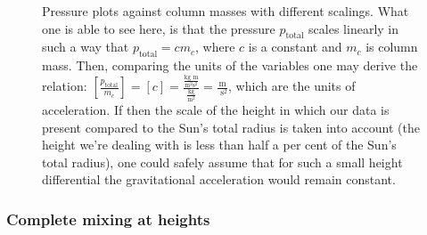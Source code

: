 \documentclass[11pt,a4paper,notitlepage]{article}
\begin{document}
\begin{figure}[H]
\caption{Pressure plots against column masses with different scalings. What one is able to see here, is that the pressure $p_\text{total}$ scales linearly in such a way that $p_\text{total} = c m_c$, where $c$ is a constant and $m_c$ is column mass. Then, comparing the units of the variables one may derive the relation: $[\frac{p_\text{total}}{m_c}] = [c] = \frac{ \frac{\text{kg m}}{\text{m$^2$s$^2$}} }{\frac{\text{kg}}{\text{m}^2}} = \frac{\text{m}}{\text{ s}^2}$, which are the units of acceleration. If then the scale of the height in which our data is present compared to the Sun's total radius is taken into account (the height we're dealing with is less than half a per cent of the Sun's total radius), one could safely assume that for such a small height differential the gravitational acceleration would remain constant.}
\end{figure}

\subsubsection{Complete mixing at heights}
\end{document}
